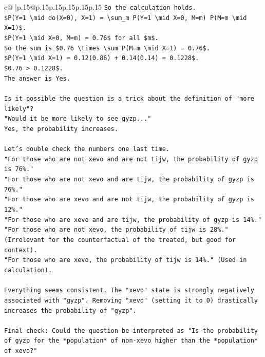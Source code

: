 \documentclass{article}
\begin{document}
{\begin{supertabular}{c@{$\;$}|p{.15\linewidth}@{}p{.15\linewidth}p{.15\linewidth}p{.15\linewidth}p{.15\linewidth}p{.15\linewidth}}
{{{\texttt{So the calculation holds.} \\
\texttt{\$P(Y=1 \textbackslash{}mid do(X=0), X=1) = \textbackslash{}sum\_m P(Y=1 \textbackslash{}mid X=0, M=m) P(M=m \textbackslash{}mid X=1)\$.} \\
\texttt{\$P(Y=1 \textbackslash{}mid X=0, M=m) = 0.76\$ for all \$m\$.} \\
\texttt{So the sum is \$0.76 \textbackslash{}times \textbackslash{}sum P(M=m \textbackslash{}mid X=1) = 0.76\$.} \\
\texttt{\$P(Y=1 \textbackslash{}mid X=1) = 0.12(0.86) + 0.14(0.14) = 0.1228\$.} \\
\texttt{\$0.76 > 0.1228\$.} \\
\texttt{The answer is Yes.} \\
\\ 
\texttt{Is it possible the question is a trick about the definition of "more likely"?} \\
\texttt{"Would it be more likely to see gyzp..."} \\
\texttt{Yes, the probability increases.} \\
\\ 
\texttt{Let's double check the numbers one last time.} \\
\texttt{"For those who are not xevo and are not tijw, the probability of gyzp is 76\%."} \\
\texttt{"For those who are not xevo and are tijw, the probability of gyzp is 76\%."} \\
\texttt{"For those who are xevo and are not tijw, the probability of gyzp is 12\%."} \\
\texttt{"For those who are xevo and are tijw, the probability of gyzp is 14\%."} \\
\texttt{"For those who are not xevo, the probability of tijw is 28\%." (Irrelevant for the counterfactual of the treated, but good for context).} \\
\texttt{"For those who are xevo, the probability of tijw is 14\%." (Used in calculation).} \\
\\ 
\texttt{Everything seems consistent. The "xevo" state is strongly negatively associated with "gyzp". Removing "xevo" (setting it to 0) drastically increases the probability of "gyzp".} \\
\\ 
\texttt{Final check: Could the question be interpreted as "Is the probability of gyzp for the *population* of non{-}xevo higher than the *population* of xevo?"} \\
}}}
\end{supertabular}}
\end{document}
